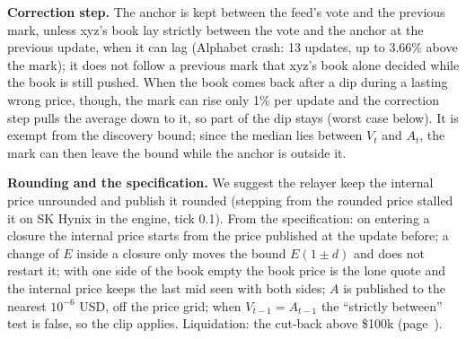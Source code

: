 \documentclass[10.5pt,a4paper]{article}
\begin{document}
\textbf{Correction step.} The anchor is kept between the feed's vote and the previous mark, unless xyz's book lay strictly between the vote and the anchor at the previous update, when it can lag (Alphabet crash: 13 updates, up to 3.66\% above the mark); it does not follow a previous mark that xyz's book alone decided while the book is still pushed. When the book comes back after a dip during a lasting wrong price, though, the mark can rise only 1\% per update and the correction step pulls the average down to it, so part of the dip stays (worst case below). It is exempt from the discovery bound; since the median lies between $V_t$ and $A_t$, the mark can then leave the bound while the anchor is outside it.

\textbf{Rounding and the specification.} We suggest the relayer keep the internal price unrounded and publish it rounded (stepping from the rounded price stalled it on SK Hynix in the engine, tick 0.1). From the specification: on entering a closure the internal price starts from the price published at the update before; a change of $E$ inside a closure only moves the bound $E(1\pm d)$ and does not restart it; with one side of the book empty the book price is the lone quote and the internal price keeps the last mid seen with both sides; $A$ is published to the nearest $10^{-6}$ USD, off the price grid; when $V_{t-1} = A_{t-1}$ the ``strictly between'' test is false, so the clip applies. Liquidation: the cut-back above \$100k (page~\pageref{sec:cutback}).
\end{document}
